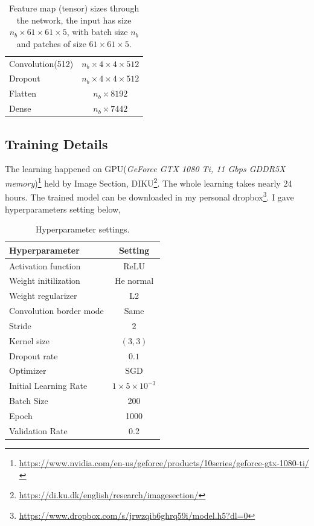 \begin{table}[h!]
\begin{tabular}{ l | c  }
            Convolution(512) & $n_b\times4\times4\times512$  \\
            Dropout & $n_b\times4\times4\times512$ \\
            Flatten & $n_b\times8192$ \\
            Dense & $n_b\times7442$ \\    
        \end{tabular}
        \caption{Feature map (tensor) sizes through the network, the input has size $n_b\times61\times61\times5$, with batch size $n_b$ and patches of size $61\times61\times5$.}
        \label{table:layers}
    \end{table}

\subsection{Training Details}
    \label{trde}
    The learning happened on GPU(\textit{GeForce GTX 1080 Ti, 11 Gbps GDDR5X memory})\footnote{\url{https://www.nvidia.com/en-us/geforce/products/10series/geforce-gtx-1080-ti/}} held by Image Section, DIKU\footnote{\url{https://di.ku.dk/english/research/imagesection/}}. The whole learning takes nearly 24 hours. The trained model can be downloaded in my personal dropbox\footnote{\url{https://www.dropbox.com/s/jrwzqib6ghrq59i/model.h5?dl=0}}. I gave hyperparameters setting below,
    \begin{table}[h!]
        \centering
        \begin{tabular}{ l | c  }
            Hyperparameter  & Setting \\ \hline
            Activation function & ReLU \\
            Weight initilization & He normal\cite{sutskever2013importance} \\
            Weight regularizer &  L2 \cite{hinton2006fast} \\
            Convolution border mode  & Same \\
            Stride & 2 \\ 
            Kernel size & $(3, 3)$ \\
            Dropout rate & $0.1$ \\
            Optimizer & SGD \\
            Initial Learning Rate & $1\times 5\times10^{-3}$ \\
            Batch Size & 200 \\
            Epoch & 1000 \\
            Validation Rate & 0.2 \\
        \end{tabular}
        \caption{Hyperparameter settings.}
        \label{table:hyper}
    \end{table}
